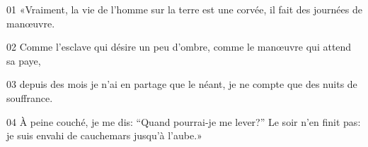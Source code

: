 01 «Vraiment, la vie de l’homme sur la terre est une corvée, il fait des journées de manœuvre.

02 Comme l’esclave qui désire un peu d’ombre, comme le manœuvre qui attend sa paye,

03 depuis des mois je n’ai en partage que le néant, je ne compte que des nuits de souffrance.

04 À peine couché, je me dis: “Quand pourrai-je me lever?” Le soir n’en finit pas: je suis envahi de cauchemars jusqu’à l’aube.»
